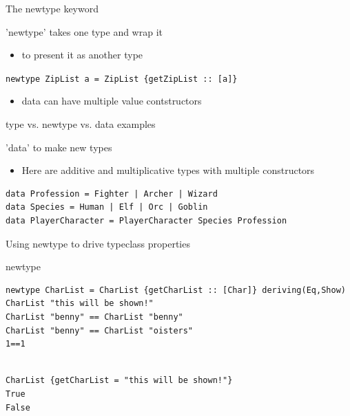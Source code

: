 \documentclass[presetation]{beamer}
\begin{document}
\begin{frame}[fragile,label={sec:org0541dbd}]{The newtype keyword}
 \begin{block}{'newtype' takes one type and wrap it}
\begin{itemize}
\item to present it as another type
\end{itemize}
\texttt{newtype ZipList a = ZipList \{getZipList :: [a]\}}
\begin{itemize}
\item data can have multiple value contstructors
\end{itemize}
\end{block}
\end{frame}
\begin{frame}[fragile,label={sec:org2bc71fe}]{type vs. newtype vs. data examples}
 \begin{block}{'data' to make new types}
\begin{itemize}
\item Here are additive and multiplicative types with multiple constructors
\end{itemize}
\begin{verbatim}
data Profession = Fighter | Archer | Wizard
data Species = Human | Elf | Orc | Goblin
data PlayerCharacter = PlayerCharacter Species Profession
\end{verbatim}
\end{block}
\end{frame}

\begin{frame}[fragile,label={sec:orge282b3c}]{Using newtype to drive typeclass properties}
 \begin{block}{newtype}
\begin{verbatim}
newtype CharList = CharList {getCharList :: [Char]} deriving(Eq,Show)
CharList "this will be shown!"
CharList "benny" == CharList "benny"
CharList "benny" == CharList "oisters"
1==1
\end{verbatim}

\begin{verbatim}

CharList {getCharList = "this will be shown!"}
True
False
\end{verbatim}
\end{block}
\end{frame}
\end{document}
